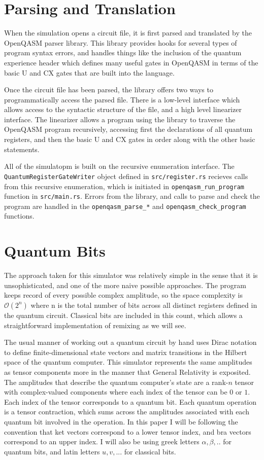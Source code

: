 \documentclass[%
 reprint,
 amsmath,amssymb,
 aps,
]{revtex4-2}
\begin{document}
\section{\label{sec:level1} Parsing and Translation}
When the simulation opens a circuit file, it is first parsed and translated by the OpenQASM parser library. This library provides hooks for several types of program syntax errors, and handles things like the inclusion of the quantum experience header which defines many useful gates in OpenQASM in terms of the basic U and CX gates that are built into the language. 

Once the circuit file has been parsed, the library offers two ways to programmatically access the parsed file. There is a low-level interface which allows access to the syntactic structure of the file, and a high level linearizer interface. The linearizer allows a program using the library to traverse the OpenQASM program recursively, accessing first the declarations of all quantum registers, and then the basic U and CX gates in order along with the other basic statements.

All of the simulatopm is built on the recursive enumeration interface. The \texttt{QuantumRegisterGateWriter} object defined in \texttt{src/register.rs} recieves calls from this recursive enumeration, which is initiated in \texttt{openqasm\_run\_program} function in \texttt{src/main.rs}. Errors from the library, and calls to parse and check the program are handled in the \texttt{openqasm\_parse\_*} and \texttt{openqasm\_check\_program} functions.

\section{\label{sec:level1} \label{qubits} Quantum Bits}
The approach taken for this simulator was relatively simple in the sense that it is unsophisticated, and one of the more naive possible approaches. The program keeps record of every possible complex amplitude, so the space complexity is $\mathcal{O}(2^n)$ where n is the total number of bits across all distinct registers defined in the quantum circuit. Classical bits are included in this count, which allows a straightforward implementation of remixing as we will see.

The usual manner of working out a quantum circuit by hand uses Dirac notation to define finite-dimensional state vectors and matrix transitions in the Hilbert space of the quantum computer. This simulator represents the same amplitudes as tensor components more in the manner that General Relativity is exposited. The amplitudes that describe the quantum computer's state are a rank-$n$ tensor with complex-valued components where each index of the tensor can be $0$ or $1$\cite{kattemolleQuantum}. Each index of the tensor corresponds to a quantum bit. Each quantum operation is a tensor contraction, which sums across the amplitudes associated with each quantum bit involved in the operation. In this paper I will be following the convention that ket vectors correspond to a lower tensor index, and bra vectors correspond to an upper index. I will also be using greek letters $\alpha, \beta, ..$ for quantum bits, and latin letters $u, v,...$ for classical bits.
\end{document}
